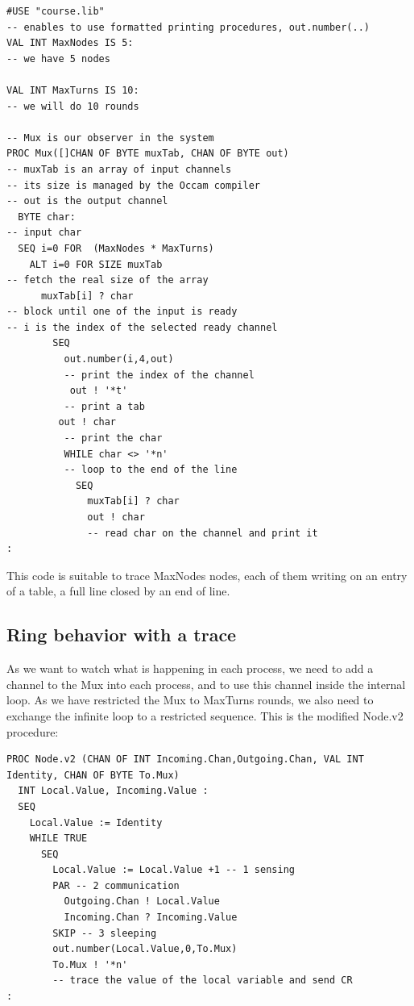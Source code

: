 \documentclass[times,a4paper]{book}
\begin{document}
\begin{lstlisting} 
#USE "course.lib"
-- enables to use formatted printing procedures, out.number(..)
VAL INT MaxNodes IS 5:
-- we have 5 nodes

VAL INT MaxTurns IS 10:
-- we will do 10 rounds

-- Mux is our observer in the system 
PROC Mux([]CHAN OF BYTE muxTab, CHAN OF BYTE out)
-- muxTab is an array of input channels
-- its size is managed by the Occam compiler
-- out is the output channel
  BYTE char:  
-- input char
  SEQ i=0 FOR  (MaxNodes * MaxTurns)
    ALT i=0 FOR SIZE muxTab
-- fetch the real size of the array
      muxTab[i] ? char
-- block until one of the input is ready
-- i is the index of the selected ready channel
        SEQ 
          out.number(i,4,out)
          -- print the index of the channel  
           out ! '*t'
          -- print a tab
         out ! char
          -- print the char
          WHILE char <> '*n'
          -- loop to the end of the line
            SEQ
              muxTab[i] ? char
              out ! char
              -- read char on the channel and print it
:
\end{lstlisting} 

This code is suitable to trace MaxNodes nodes, each of them
writing on an entry of a table, a full line closed by an end of line.
 
\subsection {Ring behavior with a  trace }
\label{sec:ring5behav}
As we want to watch what is happening in each process, we need to
add a channel to the Mux into each process, and to use this
channel inside the internal loop. As we have restricted the Mux to MaxTurns
rounds, we also need to exchange the infinite loop to 
a restricted sequence. This is the modified Node.v2 procedure:


\begin{lstlisting}  
PROC Node.v2 (CHAN OF INT Incoming.Chan,Outgoing.Chan, VAL INT Identity, CHAN OF BYTE To.Mux)  
  INT Local.Value, Incoming.Value :
  SEQ
    Local.Value := Identity
    WHILE TRUE
      SEQ
        Local.Value := Local.Value +1 -- 1 sensing
        PAR -- 2 communication
          Outgoing.Chan ! Local.Value
          Incoming.Chan ? Incoming.Value
        SKIP -- 3 sleeping
        out.number(Local.Value,0,To.Mux)
        To.Mux ! '*n'
        -- trace the value of the local variable and send CR
:
\end{lstlisting} 
\end{document}
